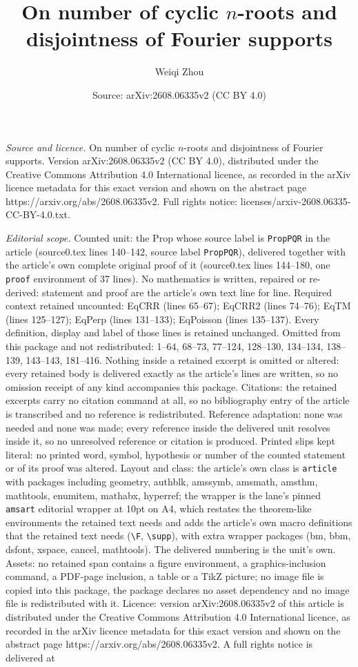 \documentclass[10pt,a4paper]{amsart}
\title[On number of cyclic $n$-roots and disjointness of Fourier su]{On number of cyclic $n$-roots and disjointness of Fourier supports}
\author{Weiqi Zhou}
\date{Source: arXiv:2608.06335v2 (CC BY 4.0)}
\begin{document}
\maketitle

\noindent\emph{Source and licence.} On number of cyclic $n$-roots and disjointness of Fourier supports. Version arXiv:2608.06335v2 (CC BY 4.0), distributed under the Creative Commons Attribution 4.0 International licence, as recorded in the arXiv licence metadata for this exact version and shown on the abstract page https://arxiv.org/abs/2608.06335v2. Full rights notice: licenses/arxiv-2608.06335-CC-BY-4.0.txt.\par\smallskip

\noindent\textit{Editorial scope.} Counted unit: the Prop whose source label is \texttt{PropPQR} in the article (source0.tex lines 140--142, source label \texttt{PropPQR}), delivered together with the article's own complete original proof of it (source0.tex lines 144--180, one \texttt{proof} environment of 37 lines). No mathematics is written, repaired or re-derived: statement and proof are the article's own text line for line. Required context retained uncounted: EqCRR (lines 65--67); EqCRR2 (lines 74--76); EqTM (lines 125--127); EqPerp (lines 131--133); EqPoisson (lines 135--137). Every definition, display and label of those lines is retained unchanged. Omitted from this package and not redistributed: 1--64, 68--73, 77--124, 128--130, 134--134, 138--139, 143--143, 181--416. Nothing inside a retained excerpt is omitted or altered: every retained body is delivered exactly as the article's lines are written, so no omission receipt of any kind accompanies this package. Citations: the retained excerpts carry no citation command at all, so no bibliography entry of the article is transcribed and no reference is redistributed. Reference adaptation: none was needed and none was made; every reference inside the delivered unit resolves inside it, so no unresolved reference or citation is produced. Printed slips kept literal: no printed word, symbol, hypothesis or number of the counted statement or of its proof was altered. Layout and class: the article's own class is \texttt{article} with packages including geometry, authblk, amssymb, amsmath, amsthm, mathtools, enumitem, mathabx, hyperref; the wrapper is the lane's pinned \texttt{amsart} editorial wrapper at 10pt on A4, which restates the theorem-like environments the retained text needs and adds the article's own macro definitions that the retained text needs (\texttt{\textbackslash F}, \texttt{\textbackslash supp}), with extra wrapper packages (bm, bbm, dsfont, xspace, cancel, mathtools). The delivered numbering is the unit's own. Assets: no retained span contains a figure environment, a graphics-inclusion command, a PDF-page inclusion, a table or a TikZ picture; no image file is copied into this package, the package declares no asset dependency and no image file is redistributed with it. Licence: version arXiv:2608.06335v2 of this article is distributed under the Creative Commons Attribution 4.0 International licence, as recorded in the arXiv licence metadata for this exact version and shown on the abstract page https://arxiv.org/abs/2608.06335v2. A full rights notice is delivered at 
\end{document}

